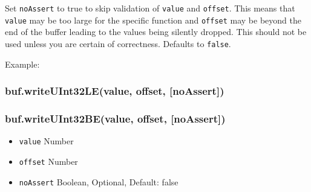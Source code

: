 Set \texttt{noAssert} to true to skip validation of \texttt{value} and
\texttt{offset}. This means that \texttt{value} may be too large for the
specific function and \texttt{offset} may be beyond the end of the
buffer leading to the values being silently dropped. This should not be
used unless you are certain of correctness. Defaults to \texttt{false}.

Example:

\begin{Shaded}
\begin{Highlighting}[]
  \NormalTok{);}
\NormalTok{(}\NormalTok{, }\NormalTok{);}
\NormalTok{(}\NormalTok{, }\NormalTok{);}


\NormalTok{(}\NormalTok{, }\NormalTok{);}
\NormalTok{(}\NormalTok{, }\NormalTok{);}


\end{Highlighting}
\end{Shaded}

\subsubsection{buf.writeUInt32LE(value, offset, {[}noAssert{]})}

\subsubsection{buf.writeUInt32BE(value, offset, {[}noAssert{]})}

\begin{itemize}
\item
  \texttt{value} Number
\item
  \texttt{offset} Number
\item
  \texttt{noAssert} Boolean, Optional, Default: false
\end{itemize}

